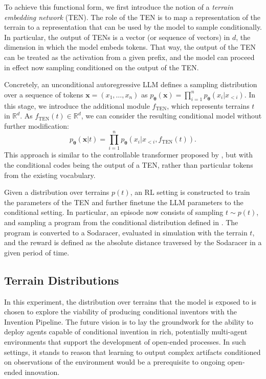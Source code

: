 \documentclass{article}
\def\vtheta{{\bm{\theta}}}
\def\vx{{\bm{x}}}
\def\sR{{\mathbb{R}}}
\begin{document}
To achieve this functional form, we first introduce the notion of a \emph{terrain embedding network} (TEN). The role of the TEN is to map a representation of the terrain to a representation that can be used by the model to sample conditionally. In particular, the output of TENs is a vector (or sequence of vectors) in $d$, the dimension in which the model embeds tokens. That way, the output of the TEN can be treated as the activation from a given prefix, and the model can proceed in effect now sampling conditioned on the output of the TEN.

Concretely, an unconditional autoregressive LLM defines a sampling distribution over a sequence of tokens $\vx = (x_1, \hdots, x_n)$ as $p_\vtheta(\vx) = \prod_{i=1}^{n} p_\vtheta(x_i | x_{<i})$. In this stage, we introduce the additional module $f_{\text{TEN}}$, which represents terrains $t$ in $\sR^d$. As $f_{\text{TEN}}(t) \in \sR^d$, we can consider the resulting conditional model without further modification: 
\begin{equation}
\label{eqn:conditionalLM}
    p_\vtheta(\vx | t) = \prod_{i=1}^{n} p_\vtheta \left( x_i | x_{<i}, f_{\text{TEN}}(t) \right). 
\end{equation}
This approach is similar to the controllable transformer proposed by \citet{keskar2019ctrl}, but with the conditional codes being the output of a TEN, rather than particular tokens from the existing vocabulary. 

Given a distribution over terrains $p(t)$, an RL setting is constructed to train the parameters of the TEN and further finetune the LLM parameters to the conditional setting. In particular, an episode now consists of sampling $t \sim p(t)$, and sampling a program from the conditional distribution defined in . The program is converted to a Sodaracer, evaluated in simulation with the terrain $t$, and the reward is defined as the absolute distance traversed by the Sodaracer in a given period of time. 


\subsection{Terrain Distributions}
\label{sec:terrain-distributions}
In this experiment, the distribution over terrains that the model is exposed to is chosen to explore the viability of producing conditional inventors with the Invention Pipeline. The future vision is to lay the groundwork for the ability to deploy agents capable of conditional invention in rich, potentially multi-agent environments that support the development of open-ended processes. In such settings, it stands to reason that learning to output complex artifacts conditioned on observations of the environment would be a prerequisite to ongoing open-ended innovation. 
\end{document}
